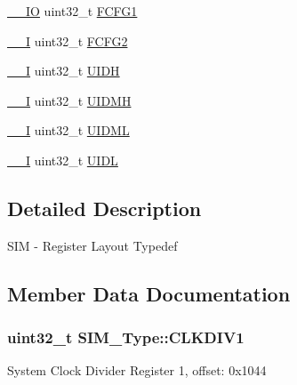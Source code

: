 \begin{DoxyCompactItemize}
\item 
\hyperlink{core__sc300_8h_aec43007d9998a0a0e01faede4133d6be}{\+\_\+\+\_\+\+IO} uint32\+\_\+t \hyperlink{structSIM__Type_ad08521bc1b834684ec167d3df1ca795d}{F\+C\+F\+G1}
\item 
\hyperlink{core__sc300_8h_af63697ed9952cc71e1225efe205f6cd3}{\+\_\+\+\_\+I} uint32\+\_\+t \hyperlink{structSIM__Type_a6a16a2d49b11f46bd5874de212f1899e}{F\+C\+F\+G2}
\item 
\hyperlink{core__sc300_8h_af63697ed9952cc71e1225efe205f6cd3}{\+\_\+\+\_\+I} uint32\+\_\+t \hyperlink{structSIM__Type_a1909475cfbad89255bfce0b2b8f426c8}{U\+I\+DH}
\item 
\hyperlink{core__sc300_8h_af63697ed9952cc71e1225efe205f6cd3}{\+\_\+\+\_\+I} uint32\+\_\+t \hyperlink{structSIM__Type_a3673a8cdd4cf80d15491e56214ee3124}{U\+I\+D\+MH}
\item 
\hyperlink{core__sc300_8h_af63697ed9952cc71e1225efe205f6cd3}{\+\_\+\+\_\+I} uint32\+\_\+t \hyperlink{structSIM__Type_a1995ae7c6cbcede0825d67e2fc3505ca}{U\+I\+D\+ML}
\item 
\hyperlink{core__sc300_8h_af63697ed9952cc71e1225efe205f6cd3}{\+\_\+\+\_\+I} uint32\+\_\+t \hyperlink{structSIM__Type_a7e55725c1aeddef811d669f56c978529}{U\+I\+DL}
\end{DoxyCompactItemize}


\subsection{Detailed Description}
S\+IM -\/ Register Layout Typedef 

\subsection{Member Data Documentation}
\subsubsection[{\texorpdfstring{C\+L\+K\+D\+I\+V1}{CLKDIV1}}]{ uint32\+\_\+t S\+I\+M\+\_\+\+Type\+::\+C\+L\+K\+D\+I\+V1}\hypertarget{structSIM__Type_a3427fbd07b693e2c8d95a79d481b694d}{}\label{structSIM__Type_a3427fbd07b693e2c8d95a79d481b694d}
System Clock Divider Register 1, offset\+: 0x1044 
